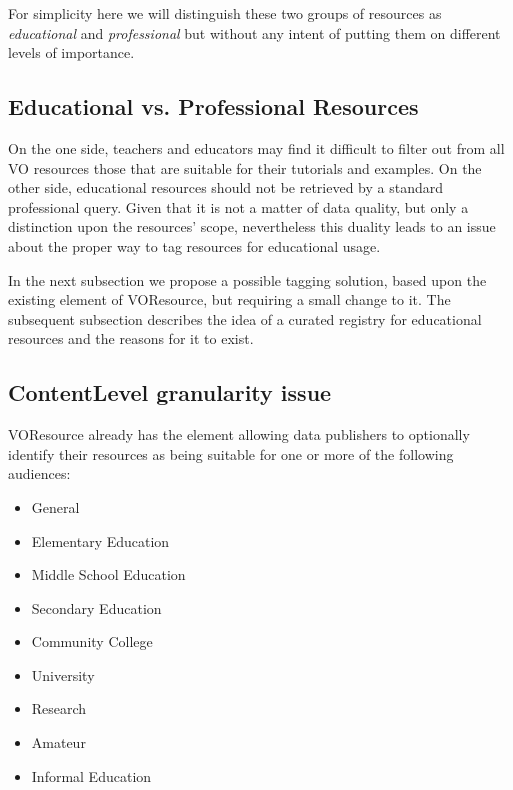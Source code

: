 \documentclass{ivoa}
\begin{document}
For simplicity here we will distinguish these two groups of resources as
\emph{educational}
 and 
\emph{professional}
 but without any intent of putting them
on different levels of importance.



\subsection{Educational vs. Professional Resources}

\label{sect:eduvspro}


On the one side, teachers and educators may find it difficult to filter out 
from all VO resources those that are suitable for their tutorials and
examples. On the other side, educational resources should not be retrieved 
by a standard professional query.
Given that it is not a matter of data quality, but only a distinction upon 
the resources' scope, nevertheless this duality leads to an issue about the
proper way to tag resources for educational usage.
  


In the next subsection we propose a possible tagging solution, based upon 
the existing 
element of VOResource, but requiring a small change
to it. The subsequent subsection describes the idea of a
curated registry for educational resources and the reasons for it to exist.
  


\subsection{ContentLevel granularity issue}

\label{sect:contentlvl}

VOResource already has the 
element
allowing data publishers to optionally identify their resources as being 
suitable for one or more of the following audiences:


\begin{itemize}

\item General{}

\item Elementary Education{}

\item Middle School Education{}

\item Secondary Education{}

\item Community College{}

\item University{}

\item Research{}

\item Amateur{}

\item Informal Education{}

\end{itemize}
\end{document}
